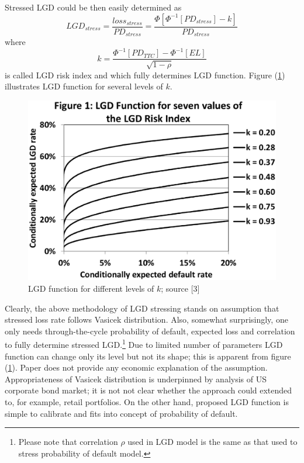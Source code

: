 \documentclass[a4paper]{article}
\begin{document}
Stressed LGD could be then  easily determined as
\begin{equation}
LGD_{stress} = \frac{loss_{stress}}{PD_{stress}} = \frac{\Phi\left[\Phi^{-1}[PD_{stress}] - 
k\right]}{PD_{stress}}
\end{equation}
where
\begin{equation}
k = \frac{\Phi^{-1}[PD_{TTC}] - \Phi^{-1}[EL]}{\sqrt{1 - \rho}}
\end{equation}
is called LGD risk index and which fully determines LGD function. Figure (\ref{lgd-function}) illustrates LGD function for several levels of $k$.

\begin{figure}[htp]
\centering
\includegraphics[scale = 0.35]{pictures/lgd-function.eps}
\caption{LGD function for different levels of $k$; source [3]}
\label{lgd-function}
\end{figure}

Clearly, the above methodology of LGD stressing stands on assumption that stressed loss rate follows Vasicek distribution.
Also, somewhat surprisingly, one only needs through-the-cycle probability of default,
expected loss and correlation to fully determine stressed LGD.\footnote{Please note that
correlation $\rho$ used in LGD model is the same as that used to stress probability of default model.}
Due to limited number of parameters LGD function can change only its level but not its shape; this is apparent from figure (\ref{lgd-function}).
Paper does not provide any economic explanation of the assumption. Appropriateness of Vasicek distribution is underpinned by analysis of US corporate bond market;
it is not not clear whether the approach could extended to, for example, retail portfolios. On the other hand, proposed LGD function is simple to calibrate and fits into concept
of probability of default.
\end{document}
